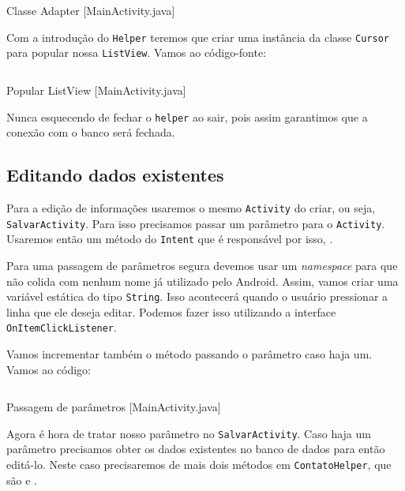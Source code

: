 \begin{listing}[H]
  \inputminted[linenos=true,frame=bottomline,tabsize=3]{ java }{ source/MainActivity-5.java }
  \caption{Classe Adapter [MainActivity.java]}
\end{listing}

Com a introdução do \texttt{Helper} teremos que criar uma instância da classe \texttt{Cursor}
para popular nossa \texttt{ListView}. Vamos ao código-fonte:

\begin{listing}[H]
  \inputminted[linenos=true,frame=bottomline,tabsize=3]{ java }{ source/MainActivity-6.java }
  \caption{Popular ListView [MainActivity.java]}
\end{listing}

Nunca esquecendo de fechar o \texttt{helper} ao sair, pois assim garantimos que a conexão com
o banco será fechada.

\subsection{Editando dados existentes\label{ssec:edit}}

Para a edição de informações usaremos o mesmo \texttt{Activity} do criar, ou seja, \texttt{SalvarActivity}.
Para isso precisamos passar um parâmetro para o \texttt{Activity}. Usaremos então um método do
\texttt{Intent} que é responsável por isso, .

Para uma passagem de parâmetros segura devemos usar um \textit{namespace} para que não colida com
nenhum nome já utilizado pelo Android. Assim, vamos criar uma variável estática do tipo \texttt{String}.
Isso acontecerá quando o usuário pressionar a linha que ele deseja editar. Podemos fazer isso utilizando
a interface \texttt{OnItemClickListener}.

Vamos incrementar também o método  passando o parâmetro caso haja um. Vamos ao
código:

\begin{listing}[H]
  \inputminted[linenos=true,frame=bottomline,tabsize=3]{ java }{ source/MainActivity-7.java }
  \caption{Passagem de parâmetros [MainActivity.java]}
\end{listing}

Agora é hora de tratar nosso parâmetro no \texttt{SalvarActivity}. Caso haja um parâmetro precisamos
obter os dados existentes no banco de dados para então editá-lo. Neste caso precisaremos de mais dois
métodos em \texttt{ContatoHelper}, que são  e .

